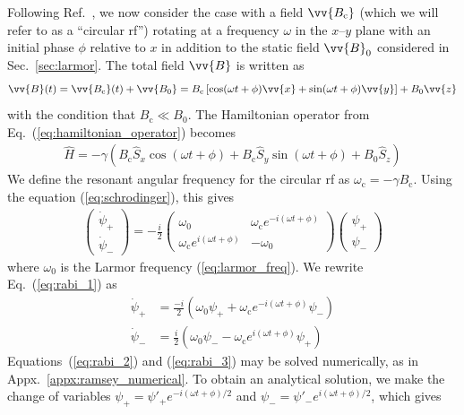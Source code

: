 Following Ref.~\cite{may_thesis}, we now consider the case with a field $\vv{B_\text{c}}$ (which we will refer to as a ``circular \acrshort{rf}'') rotating at a frequency $\omega$ in the $x$--$y$ plane with an initial phase $\phi$ relative to $x$ in addition to the static field $\vv{B}_0$ considered in Sec.~\ref{sec:larmor}. The total field $\vv{B}$ is written as
%
\begin{gather}
    \vv{B}(t)=\vv{B_\text{c}}(t) + \vv{B_0}=B_\text{c}\left[ \cos (\omega t + \phi) \vv{x} + \sin (\omega t + \phi) \vv{y}\right] + B_0 \vv{z}\label{eq:B0_with_circular_rf}
\end{gather}
%
with the condition that $B_\text{c} \ll B_0$. The Hamiltonian operator from Eq.~(\ref{eq:hamiltonian_operator}) becomes
%
\begin{gather}
    \hat{H} = -\gamma \left( B_\text{c} \hat{S}_x \cos (\omega t + \phi) + B_\text{c} \hat{S}_y  \sin (\omega t + \phi) + B_0\hat{S}_z \right)\label{eq:rabi_hamiltonian}
\end{gather}
%
We define the resonant angular frequency for the circular \acrshort*{rf} as $\omega_\text{c}=-\gamma B_\text{c}$. Using the \schrodinger equation (\ref{eq:schrodinger}), this gives
%
\begin{gather}
    \left(\begin{matrix}
        \dot{\psi}_+\\
        \dot{\psi}_-
    \end{matrix}\right)
    = -\frac{i}{2}
    \left(\begin{matrix}
        \omega_0 & \omega_\text{c}e^{-i(\omega t + \phi)}\\
        \omega_\text{c}e^{i(\omega t + \phi)} & -\omega_0
    \end{matrix} \right)
    \left(\begin{matrix}
        \psi_+\\
        \psi_-
    \end{matrix}\right)\label{eq:rabi_1}
\end{gather}
%
where $\omega_0$ is the Larmor frequency (\ref{eq:larmor_freq}). We rewrite Eq.~(\ref{eq:rabi_1}) as
%
\begin{align}
    \dot{\psi}_+ &=\frac{-i}{2}\left( \omega_0 \psi_+ + \omega_\text{c} e^{-i(\omega t + \phi)} \psi_- \right)\label{eq:rabi_2}\\
    \dot{\psi}_- &=\frac{i}{2}\left( \omega_0 \psi_- - \omega_\text{c} e^{i(\omega t + \phi)} \psi_+ \right)\label{eq:rabi_3}
\end{align}
%
Equations~(\ref{eq:rabi_2}) and (\ref{eq:rabi_3}) may be solved numerically, as in Appx.~\ref{appx:ramsey_numerical}. To obtain an analytical solution, we make the change of variables $\psi_+ = \psi'_+ e^{-i(\omega t + \phi)/2}$ and $\psi_- = \psi'_- e^{i(\omega t + \phi)/2}$, which gives
